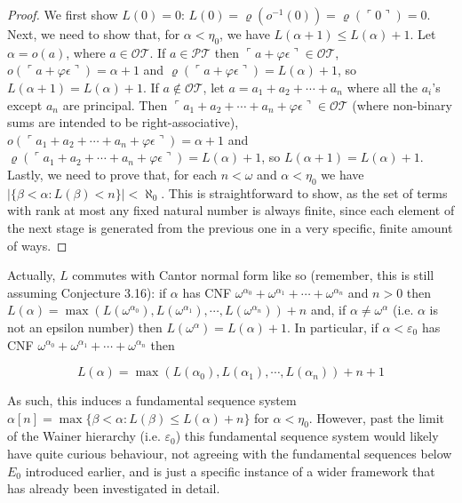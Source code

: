 \documentclass{article}
\theoremstyle{definition}
\theoremstyle{plain}
\theoremstyle{plain}
\theoremstyle{plain}
\theoremstyle{plain}
\theoremstyle{remark}
\theoremstyle{remark}
\theoremstyle{remark}
\theoremstyle{plain}
\theoremstyle{plain}
\begin{document}
\begin{proof}
We first show $L(0) = 0$: $L(0) = \varrho(o^{-1}(0)) = \varrho(\ulcorner 0 \urcorner) = 0$. Next, we need to show that, for $\alpha < \eta_0$, we have $L(\alpha+1) \leq L(\alpha)+1$. Let $\alpha = o(a)$, where $a \in \mathcal{OT}$. If $a \in \mathcal{PT}$ then $\ulcorner a + \varphi \epsilon \urcorner \in \mathcal{OT}$, $o(\ulcorner a + \varphi \epsilon \urcorner) = \alpha+1$ and $\varrho(\ulcorner a + \varphi \epsilon \urcorner) = L(\alpha)+1$, so $L(\alpha+1) = L(\alpha)+1$. If $a \notin \mathcal{OT}$, let $a = a_1 + a_2 + \cdots + a_n$ where all the $a_i$'s except $a_n$ are principal. Then $\ulcorner a_1 + a_2 + \cdots + a_n + \varphi \epsilon \urcorner \in \mathcal{OT}$ (where non-binary sums are intended to be right-associative), $o(\ulcorner a_1 + a_2 + \cdots + a_n + \varphi \epsilon \urcorner) = \alpha+1$ and $\varrho(\ulcorner a_1 + a_2 + \cdots + a_n + \varphi \epsilon \urcorner) = L(\alpha)+1$, so $L(\alpha+1) = L(\alpha)+1$. Lastly, we need to prove that, for each $n < \omega$ and $\alpha < \eta_0$ we have $|\{\beta < \alpha: L(\beta) < n\}| < \aleph_0$. This is straightforward to show, as the set of terms with rank at most any fixed natural number is always finite, since each element of the next stage is generated from the previous one in a very specific, finite amount of ways.
\end{proof}

Actually, $L$ commutes with Cantor normal form like so (remember, this is still assuming Conjecture 3.16): if $\alpha$ has CNF $\omega^{\alpha_0} + \omega^{\alpha_1} + \cdots + \omega^{\alpha_n}$ and $n > 0$ then $L(\alpha) = \max(L(\omega^{\alpha_0}), L(\omega^{\alpha_1}), \cdots, L(\omega^{\alpha_n})) + n$ and, if $\alpha \neq \omega^\alpha$ (i.e. $\alpha$ is not an epsilon number) then $L(\omega^\alpha) = L(\alpha) + 1$. In particular, if $\alpha < \varepsilon_0$ has CNF $\omega^{\alpha_0} + \omega^{\alpha_1} + \cdots + \omega^{\alpha_n}$ then

\begin{equation}
L(\alpha) = \max(L(\alpha_0), L(\alpha_1), \cdots, L(\alpha_n)) + n + 1
\end{equation}

As such, this induces a fundamental sequence system $\alpha[n] = \max\{\beta < \alpha: L(\beta) \leq L(\alpha) + n\}$ for $\alpha < \eta_0$. However, past the limit of the Wainer hierarchy (i.e. $\varepsilon_0$) this fundamental sequence system would likely have quite curious behaviour, not agreeing with the fundamental sequences below $E_0$ introduced earlier, and is just a specific instance of a wider framework that has already been investigated in detail.
\end{document}
